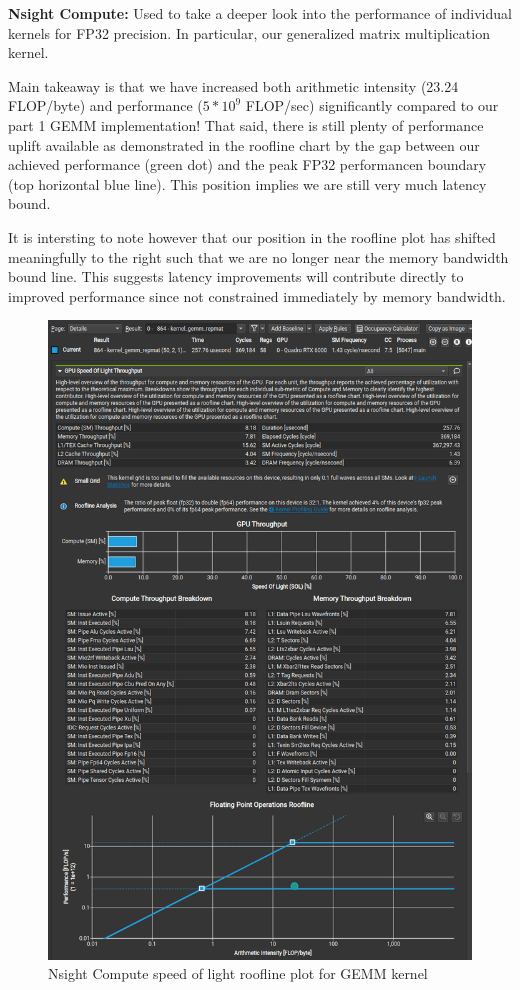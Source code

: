 \documentclass[12pt,letterpaper,twoside]{article}
\begin{document}
\textbf{Nsight Compute:} Used to take a deeper look into the performance of 
individual kernels for FP32 precision. In particular, our generalized matrix multiplication kernel. 

Main takeaway is that we have increased both arithmetic intensity (23.24 FLOP/byte) and performance
($5*10^{9}$ FLOP/sec) significantly compared to our part 1 GEMM implementation! That said, there is still 
plenty of performance uplift available as demonstrated in the roofline chart by the gap between 
our achieved performance (green dot) and the peak FP32 performancen boundary (top horizontal 
blue line). This position implies we are still very much latency bound. 

It is intersting to note however that our position in the roofline plot has shifted meaningfully to 
the right such that we are no longer near the memory bandwidth bound line. This suggests latency 
improvements will contribute directly to improved performance since not constrained immediately
by memory bandwidth. 

\begin{figure}[!htbp]
    \centering
    \includegraphics[scale=0.5]{nsight_compute_roofline2.png}
    \caption{Nsight Compute speed of light roofline plot for GEMM kernel}
\end{figure}
\end{document}
